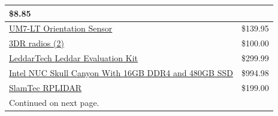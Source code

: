 \documentclass[compsoc,draftclsnofoot,onecolumn,10pt]{IEEEtran}
\begin{document}
\begin{table}[htbp]
{\begin{tabular}{ |p{3cm}|p{1cm}|  }
    {\tiny \$8.85}\\
    \hline
    {\tiny \href{http://www.chrobotics.com/shop/um7-lt-orientation-sensor}{UM7-LT Orientation Sensor}} &
    
    {\tiny \$139.95}\\
    \hline
    {\tiny \href{https://3dr.com/wp-content/uploads/2017/03/3DR-Radio-V2-doc1.pdf}{3DR radios (2)}} &
    
    {\tiny \$100.00}\\
    \hline
    {\tiny \href{http://leddartech.com/leddar-evaluation-kit/}{LeddarTech Leddar Evaluation Kit}} &
    
    {\tiny \$299.99}\\
    \hline
    {\tiny \href{http://www.intel.com/content/www/us/en/nuc/nuc-kit-nuc6i7kyk-features-configurations.html}{Intel NUC Skull Canyon \newline With 16GB DDR4 and 480GB SSD}}&
    
    {\tiny \$994.98}\\
    \hline
    {\tiny \href{https://www.slamtec.com/en/Lidar}{SlamTec RPLIDAR}} &
    
    {\tiny \$199.00}\\
    \hline
    {\tiny Continued on next page.} &
    
     \\
    \hline
    
    \end{tabular}}
    \end{table}
    
    \newpage
    
\end{document}
